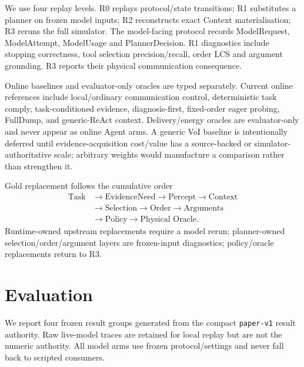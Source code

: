 \documentclass[journal,10pt]{IEEEtran}
\begin{document}
We use four replay levels. R0 replays protocol/state transitions; R1 substitutes a planner on
frozen model inputs; R2 reconstructs exact Context materialisation; R3 reruns the full simulator.
The model-facing protocol records ModelRequest, ModelAttempt, ModelUsage and PlannerDecision. R1
diagnostics include stopping correctness, tool selection precision/recall, order LCS and argument
grounding. R3 reports their physical communication consequence.

Online baselines and evaluator-only oracles are typed separately. Current online references
include local/ordinary communication control, deterministic task comply, task-conditioned
evidence, diagnosis-first, fixed-order eager probing, FullDump, and generic-ReAct context.
Delivery/energy oracles are evaluator-only and never appear as online Agent arms. A generic VoI
baseline is intentionally deferred until evidence-acquisition cost/value has a source-backed or
simulator-authoritative scale; arbitrary weights would manufacture a comparison rather than
strengthen it.

Gold replacement follows the cumulative order
\begin{equation}
\begin{aligned}
\text{Task}&\rightarrow\text{EvidenceNeed}\rightarrow\text{Percept}\rightarrow\text{Context}\\
&\rightarrow\text{Selection}\rightarrow\text{Order}\rightarrow\text{Arguments}\\
&\rightarrow\text{Policy}\rightarrow\text{Physical Oracle}.
\end{aligned}
\end{equation}
Runtime-owned upstream replacements require a model rerun; planner-owned selection/order/argument
layers are frozen-input diagnostics; policy/oracle replacements return to R3.

\section{Evaluation}
\label{sec:evaluation}
We report four frozen result groups generated from the compact
\texttt{paper-v1} result authority. Raw live-model traces are retained for local
replay but are not the numeric authority. All model arms use frozen protocol/settings and never
fall back to scripted consumers.
\end{document}
